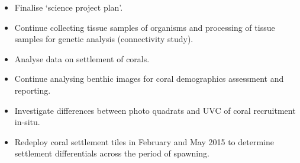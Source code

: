 \documentclass[version=last, paper=a4, DIV=18, usenames, dvipsnames]{scrartcl}
\begin{document}
\begin{itemize}

  \item Finalise `science project plan'.

  \item Continue collecting tissue samples of organisms and processing of tissue samples for genetic analysis (connectivity study).

  \item Analyse data on settlement of corals.

  \item Continue analysing benthic images for coral demographics assessment and reporting.

  \item Investigate differences between photo quadrats and UVC of coral recruitment in-situ.

  \item Redeploy coral settlement tiles in February and May 2015 to determine settlement differentials across the period of spawning.

\end{itemize}






\clearpage
\end{document}
